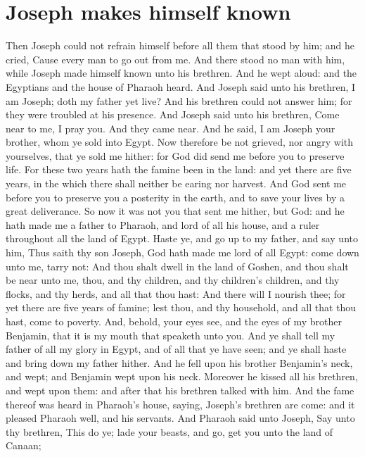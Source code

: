 \section*{Joseph makes himself known}
\begin{biblechapter} %
\verse Then Joseph could not refrain himself before all them that stood by him; and he cried, Cause every man to go out from me. And there stood no man with him, while Joseph made himself known unto his brethren.
\verse And he wept aloud: and the Egyptians and the house of Pharaoh heard.
\verse And Joseph said unto his brethren, I am Joseph; doth my father yet live? And his brethren could not answer him; for they were troubled at his presence.
\verse And Joseph said unto his brethren, Come near to me, I pray you. And they came near. And he said, I am Joseph your brother, whom ye sold into Egypt.
\verse Now therefore be not grieved, nor angry with yourselves, that ye sold me hither: for God did send me before you to preserve life.
\verse For these two years hath the famine been in the land: and yet there are five years, in the which there shall neither be earing nor harvest.
\verse And God sent me before you to preserve you a posterity in the earth, and to save your lives by a great deliverance.
\verse So now it was not you that sent me hither, but God: and he hath made me a father to Pharaoh, and lord of all his house, and a ruler throughout all the land of Egypt.
\verse Haste ye, and go up to my father, and say unto him, Thus saith thy son Joseph, God hath made me lord of all Egypt: come down unto me, tarry not:
\verse And thou shalt dwell in the land of Goshen, and thou shalt be near unto me, thou, and thy children, and thy children's children, and thy flocks, and thy herds, and all that thou hast:
\verse And there will I nourish thee; for yet there are five years of famine; lest thou, and thy household, and all that thou hast, come to poverty.
\verse And, behold, your eyes see, and the eyes of my brother Benjamin, that it is my mouth that speaketh unto you.
\verse And ye shall tell my father of all my glory in Egypt, and of all that ye have seen; and ye shall haste and bring down my father hither.
\verse And he fell upon his brother Benjamin's neck, and wept; and Benjamin wept upon his neck.
\verse Moreover he kissed all his brethren, and wept upon them: and after that his brethren talked with him.
\verse And the fame thereof was heard in Pharaoh's house, saying, Joseph's brethren are come: and it pleased Pharaoh well, and his servants.
\verse And Pharaoh said unto Joseph, Say unto thy brethren, This do ye; lade your beasts, and go, get you unto the land of Canaan;

\end{biblechapter}
